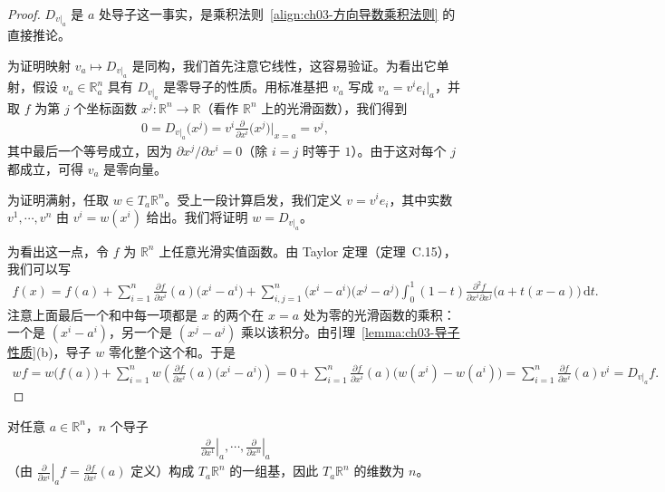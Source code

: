 \documentclass[../../main.tex]{subfiles}
\begin{document}
\begin{proof}
$D_{v|_{a}}$ 是 $a$ 处导子这一事实，是乘积法则~\eqref{align:ch03-方向导数乘积法则} 的直接推论。

为证明映射 $v_{a}\mapsto D_{v|_{a}}$ 是同构，我们首先注意它线性，这容易验证。为看出它单射，假设 $v_{a}\in\mathbb{R}^{n}_{a}$ 具有 $D_{v|_{a}}$ 是零导子的性质。用标准基把 $v_{a}$ 写成 $v_{a}=v^{i}e_{i}|_{a}$，并取 $f$ 为第 $j$ 个坐标函数 $x^{j}:\mathbb{R}^{n}\to\mathbb{R}$（看作 $\mathbb{R}^{n}$ 上的光滑函数），我们得到
\begin{align*}
0=D_{v|_{a}}\bigl(x^{j}\bigr)=v^{i}\frac{\partial}{\partial x^{i}}\bigl(x^{j}\bigr)\bigg|_{x=a}=v^{j},
\end{align*}
其中最后一个等号成立，因为 $\partial x^{j}/\partial x^{i}=0$（除 $i=j$ 时等于 $1$）。由于这对每个 $j$ 都成立，可得 $v_{a}$ 是零向量。

为证明满射，任取 $w\in T_{a}\mathbb{R}^{n}$。受上一段计算启发，我们定义 $v=v^{i}e_{i}$，其中实数 $v^{1},\cdots ,v^{n}$ 由 $v^{i}=w(x^{i})$ 给出。我们将证明 $w=D_{v|_{a}}$。

为看出这一点，令 $f$ 为 $\mathbb{R}^{n}$ 上任意光滑实值函数。由 Taylor 定理（定理~C.15），我们可以写
\begin{align*}
f(x)=f(a)+\sum_{i=1}^{n}\frac{\partial f}{\partial x^{i}}(a)\bigl(x^{i}-a^{i}\bigr)
+\sum_{i,j=1}^{n}\bigl(x^{i}-a^{i}\bigr)\bigl(x^{j}-a^{j}\bigr)\int_{0}^{1}(1-t)\frac{\partial^{2}f}{\partial x^{i}\partial x^{j}}\bigl(a+t(x-a)\bigr)\,\mathrm{d}t.
\end{align*}
注意上面最后一个和中每一项都是 $x$ 的两个在 $x=a$ 处为零的光滑函数的乘积：一个是 $(x^{i}-a^{i})$，另一个是 $(x^{j}-a^{j})$ 乘以该积分。由引理~\cref{lemma:ch03-导子性质}(b)，导子 $w$ 零化整个这个和。于是
\begin{align*}
wf=w\bigl(f(a)\bigr)+\sum_{i=1}^{n}w\left(\frac{\partial f}{\partial x^{i}}(a)\bigl(x^{i}-a^{i}\bigr)\right)
=0+\sum_{i=1}^{n}\frac{\partial f}{\partial x^{i}}(a)\bigl(w(x^{i})-w(a^{i})\bigr)
=\sum_{i=1}^{n}\frac{\partial f}{\partial x^{i}}(a)v^{i}=D_{v|_{a}}f.
\end{align*}
\end{proof}

\begin{corollary}\label{corollary:ch03-偏导基}
对任意 $a\in\mathbb{R}^{n}$，$n$ 个导子
\begin{align*}
\left.\frac{\partial}{\partial x^{1}}\right|_{a},\cdots ,\left.\frac{\partial}{\partial x^{n}}\right|_{a}
\end{align*}
（由 $\left.\frac{\partial}{\partial x^{i}}\right|_{a}f=\frac{\partial f}{\partial x^{i}}(a)$ 定义）构成 $T_{a}\mathbb{R}^{n}$ 的一组基，因此 $T_{a}\mathbb{R}^{n}$ 的维数为 $n$。
\end{corollary}
\end{document}
